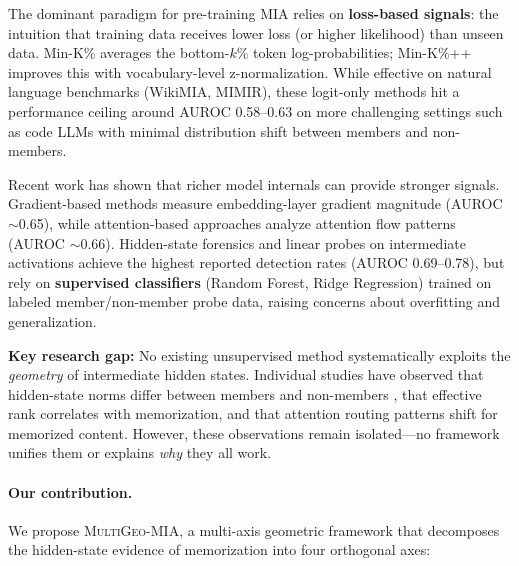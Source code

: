 \documentclass[11pt]{article}
\newcommand{\ours}{\textsc{MultiGeo-MIA}}
\begin{document}
The dominant paradigm for pre-training MIA relies on \textbf{loss-based signals}: the intuition that training data receives lower loss (or higher likelihood) than unseen data.
Min-K\% \citep{shi2024detecting} averages the bottom-$k$\% token log-probabilities; Min-K\%++ \citep{zhang2024minkpp} improves this with vocabulary-level z-normalization.
While effective on natural language benchmarks (WikiMIA, MIMIR), these logit-only methods hit a performance ceiling around AUROC 0.58--0.63 on more challenging settings such as code LLMs with minimal distribution shift between members and non-members.

Recent work has shown that richer model internals can provide stronger signals.
Gradient-based methods \citep{wu2025survey} measure embedding-layer gradient magnitude (AUROC $\sim$0.65), while attention-based approaches analyze attention flow patterns \citep{wang2025attenmia} (AUROC $\sim$0.66).
Hidden-state forensics \citep{makhija2025memtrace} and linear probes \citep{ibanez2024lumia} on intermediate activations achieve the highest reported detection rates (AUROC 0.69--0.78), but rely on \textbf{supervised classifiers} (Random Forest, Ridge Regression) trained on labeled member/non-member probe data, raising concerns about overfitting and generalization.

\textbf{Key research gap:} No existing unsupervised method systematically exploits the \textit{geometry} of intermediate hidden states.
Individual studies have observed that hidden-state norms differ between members and non-members \citep{makhija2025memtrace}, that effective rank correlates with memorization, and that attention routing patterns shift for memorized content.
However, these observations remain isolated---no framework unifies them or explains \textit{why} they all work.

\paragraph{Our contribution.}
We propose \ours{}, a multi-axis geometric framework that decomposes the hidden-state evidence of memorization into four orthogonal axes:
\end{document}
